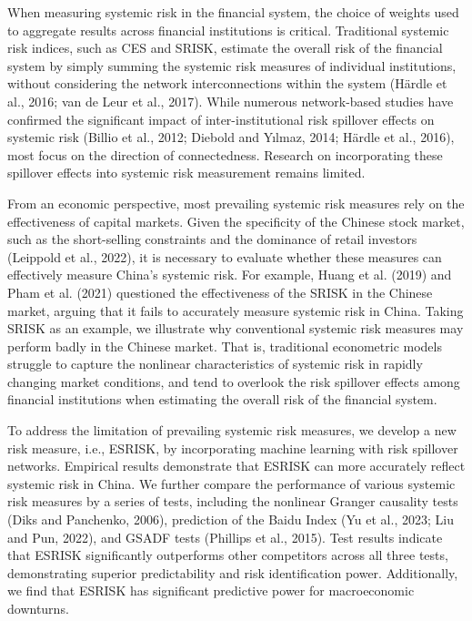 \documentclass[12pt,a4paper]{article}
\begin{document}
    When measuring systemic risk in the financial system, the choice of weights used to aggregate results across financial institutions is critical. Traditional systemic risk indices, such as CES and SRISK, estimate the overall risk of the financial system by simply summing the systemic risk measures of individual institutions, without considering the network interconnections within the system (H\"ardle et al., 2016; van de Leur et al., 2017). While numerous network-based studies have confirmed the significant impact of inter-institutional risk spillover effects on systemic risk (Billio et al., 2012; Diebold and Y{\i}lmaz, 2014; H\"ardle et al., 2016), most focus on the direction of connectedness. Research on incorporating these spillover effects into systemic risk measurement remains limited.

    From an economic perspective, most prevailing systemic risk measures rely on the effectiveness of capital markets. Given the specificity of the Chinese stock market, such as the short-selling constraints and the dominance of retail investors (Leippold et al., 2022), it is necessary to evaluate whether these measures can effectively measure China's systemic risk. For example, Huang et al. (2019) and Pham et al. (2021) questioned the effectiveness of the SRISK in the Chinese market, arguing that it fails to accurately measure systemic risk in China. Taking SRISK as an example, we illustrate why conventional systemic risk measures may perform badly in the Chinese market. That is, traditional econometric models struggle to capture the nonlinear characteristics of systemic risk in rapidly changing market conditions, and tend to overlook the risk spillover effects among financial institutions when estimating the overall risk of the financial system.

    To address the limitation of prevailing systemic risk measures, we develop a new risk measure, i.e., ESRISK, by incorporating machine learning with risk spillover networks. Empirical results demonstrate that ESRISK can more accurately reflect systemic risk in China. We further compare the performance of various systemic risk measures by a series of tests, including the nonlinear Granger causality tests (Diks and Panchenko, 2006), prediction of the Baidu Index (Yu et al., 2023; Liu and Pun, 2022), and GSADF tests (Phillips et al., 2015). Test results indicate that ESRISK significantly outperforms other competitors across all three tests, demonstrating superior predictability and risk identification power. Additionally, we find that ESRISK has significant predictive power for macroeconomic downturns.
\end{document}
